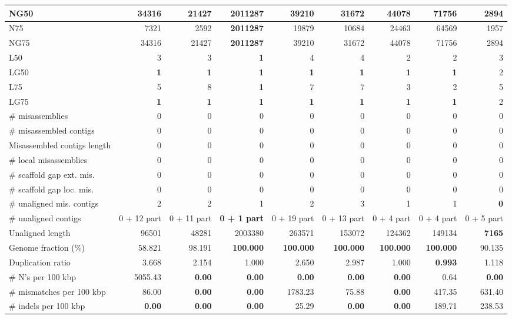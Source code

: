 \documentclass[12pt,a4paper]{article}
\begin{document}
\begin{table}[ht]
\begin{center}
\begin{tabular}{|l*{8}{|r}|}
NG50 & 34316 & 21427 & {\bf 2011287} & 39210 & 31672 & 44078 & 71756 & 2894 \\ \hline
N75 & 7321 & 2592 & {\bf 2011287} & 19879 & 10684 & 24463 & 64569 & 1957 \\ \hline
NG75 & 34316 & 21427 & {\bf 2011287} & 39210 & 31672 & 44078 & 71756 & 2894 \\ \hline
L50 & 3 & 3 & {\bf 1} & 4 & 4 & 2 & 2 & 3 \\ \hline
LG50 & {\bf 1} & {\bf 1} & {\bf 1} & {\bf 1} & {\bf 1} & {\bf 1} & {\bf 1} & 2 \\ \hline
L75 & 5 & 8 & {\bf 1} & 7 & 7 & 3 & 2 & 5 \\ \hline
LG75 & {\bf 1} & {\bf 1} & {\bf 1} & {\bf 1} & {\bf 1} & {\bf 1} & {\bf 1} & 2 \\ \hline
\# misassemblies & 0 & 0 & 0 & 0 & 0 & 0 & 0 & 0 \\ \hline
\# misassembled contigs & 0 & 0 & 0 & 0 & 0 & 0 & 0 & 0 \\ \hline
Misassembled contigs length & 0 & 0 & 0 & 0 & 0 & 0 & 0 & 0 \\ \hline
\# local misassemblies & 0 & 0 & 0 & 0 & 0 & 0 & 0 & 0 \\ \hline
\# scaffold gap ext. mis. & 0 & 0 & 0 & 0 & 0 & 0 & 0 & 0 \\ \hline
\# scaffold gap loc. mis. & 0 & 0 & 0 & 0 & 0 & 0 & 0 & 0 \\ \hline
\# unaligned mis. contigs & 2 & 2 & 1 & 2 & 3 & 1 & 1 & {\bf 0} \\ \hline
\# unaligned contigs & 0 + 12 part & 0 + 11 part & {\bf 0 + 1 part} & 0 + 19 part & 0 + 13 part & 0 + 4 part & 0 + 4 part & 0 + 5 part \\ \hline
Unaligned length & 96501 & 48281 & 2003380 & 263571 & 153072 & 124362 & 149134 & {\bf 7165} \\ \hline
Genome fraction (\%) & 58.821 & 98.191 & {\bf 100.000} & {\bf 100.000} & {\bf 100.000} & {\bf 100.000} & {\bf 100.000} & 90.135 \\ \hline
Duplication ratio & 3.668 & 2.154 & 1.000 & 2.650 & 2.987 & 1.000 & {\bf 0.993} & 1.118 \\ \hline
\# N's per 100 kbp & 5055.43 & {\bf 0.00} & {\bf 0.00} & {\bf 0.00} & {\bf 0.00} & {\bf 0.00} & 0.64 & {\bf 0.00} \\ \hline
\# mismatches per 100 kbp & 86.00 & {\bf 0.00} & {\bf 0.00} & 1783.23 & 75.88 & {\bf 0.00} & 417.35 & 631.40 \\ \hline
\# indels per 100 kbp & {\bf 0.00} & {\bf 0.00} & {\bf 0.00} & 25.29 & {\bf 0.00} & {\bf 0.00} & 189.71 & 238.53 \\ \hline

\end{tabular}
\end{center}
\end{table}
\end{document}
